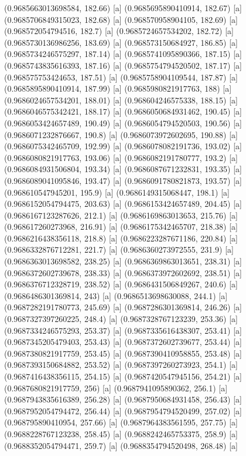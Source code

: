 {{{(0.9685663013698584, 182.66) [a] 
(0.9685695890410914, 182.67) [a] 
(0.9685706849315023, 182.68) [a] 
(0.968570958904105, 182.69) [a] 
(0.968572054794516, 182.7) [a] 
(0.9685724657534202, 182.72) [a] 
(0.9685730136986256, 183.69) [a] 
(0.968573150684927, 186.85) [a] 
(0.9685734246575297, 187.14) [a] 
(0.9685741095890366, 187.15) [a] 
(0.9685743835616393, 187.16) [a] 
(0.9685754794520502, 187.17) [a] 
(0.968575753424653, 187.51) [a] 
(0.9685758904109544, 187.87) [a] 
(0.9685895890410914, 187.99) [a] 
(0.9685980821917763, 188) [a] 
(0.9686024657534201, 188.01) [a] 
(0.968604246575338, 188.15) [a] 
(0.9686046575342421, 188.17) [a] 
(0.9686050684931462, 190.45) [a] 
(0.9686053424657489, 190.49) [a] 
(0.9686054794520503, 190.56) [a] 
(0.9686071232876667, 190.8) [a] 
(0.9686073972602695, 190.88) [a] 
(0.9686075342465709, 192.99) [a] 
(0.9686078082191736, 193.02) [a] 
(0.9686080821917763, 193.06) [a] 
(0.9686082191780777, 193.2) [a] 
(0.9686084931506804, 193.34) [a] 
(0.9686087671232831, 193.35) [a] 
(0.9686089041095846, 193.47) [a] 
(0.9686091780821873, 193.57) [a] 
(0.968610547945201, 195.9) [a] 
(0.9686149315068447, 198.1) [a] 
(0.9686152054794475, 203.63) [a] 
(0.9686153424657489, 204.45) [a] 
(0.9686167123287626, 212.1) [a] 
(0.9686169863013653, 215.76) [a] 
(0.968617260273968, 216.91) [a] 
(0.9686175342465707, 218.38) [a] 
(0.9686216438356118, 218.8) [a] 
(0.9686223287671186, 220.84) [a] 
(0.9686332876712281, 221.7) [a] 
(0.9686360273972555, 231.9) [a] 
(0.9686363013698582, 238.25) [a] 
(0.9686369863013651, 238.31) [a] 
(0.9686372602739678, 238.33) [a] 
(0.9686373972602692, 238.51) [a] 
(0.9686376712328719, 238.52) [a] 
(0.9686431506849267, 240.6) [a] 
(0.9686486301369814, 243) [a] 
(0.9686513698630088, 244.1) [a] 
(0.9687282191780773, 245.69) [a] 
(0.9687286301369814, 246.26) [a] 
(0.9687327397260225, 248.4) [a] 
(0.9687328767123239, 253.36) [a] 
(0.9687334246575293, 253.37) [a] 
(0.9687335616438307, 253.41) [a] 
(0.9687345205479403, 253.43) [a] 
(0.9687372602739677, 253.44) [a] 
(0.9687380821917759, 253.45) [a] 
(0.9687390410958855, 253.48) [a] 
(0.9687393150684882, 253.52) [a] 
(0.9687397260273923, 254.1) [a] 
(0.9687416438356115, 254.15) [a] 
(0.9687420547945156, 254.21) [a] 
(0.9687680821917759, 256) [a] 
(0.9687941095890362, 256.1) [a] 
(0.9687943835616389, 256.28) [a] 
(0.9687950684931458, 256.43) [a] 
(0.9687952054794472, 256.44) [a] 
(0.9687954794520499, 257.02) [a] 
(0.968795890410954, 257.66) [a] 
(0.9687964383561595, 257.75) [a] 
(0.9688228767123238, 258.45) [a] 
(0.9688242465753375, 258.9) [a] 
(0.9688352054794471, 259.7) [a] 
(0.9688354794520498, 268.48) [a] 
}}}

